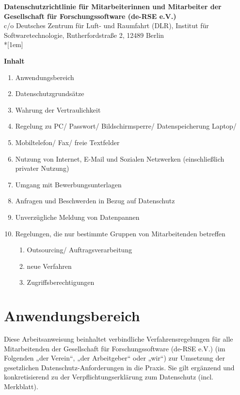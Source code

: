 \documentclass[a4paper, fontsize=11pt]{scrartcl}
\begin{document}
\thispagestyle{headings}
\vspace{-8.5cm}
\begin{centering}
{\large\textbf{Datenschutzrichtlinie für Mitarbeiterinnen und Mitarbeiter der Gesellschaft für Forschungssoftware (de-RSE e.V.)}}\\
{\tiny c/o Deutsches Zentrum für Luft- und Raumfahrt (DLR), Institut für Softwaretechnologie, Rutherfordstraße 2, 12489 Berlin}\\*[1em]
\end{centering}
\vspace{0.5cm}
{\large\textbf{Inhalt}} \\
\begin{enumerate}
    \item Anwendungsbereich
    \item Datenschutzgrundsätze
    \item Wahrung der Vertraulichkeit
    \item Regelung zu PC/ Passwort/ Bildschirmsperre/ Datenspeicherung Laptop/
    \item Mobiltelefon/ Fax/ freie Textfelder
    \item Nutzung von Internet, E-Mail und Sozialen Netzwerken (einschließlich privater Nutzung)
    \item Umgang mit Bewerbungsunterlagen
    \item Anfragen und Beschwerden in Bezug auf Datenschutz
    \item Unverzügliche Meldung von Datenpannen
    \item Regelungen, die nur bestimmte Gruppen von Mitarbeitenden betreffen
    \begin{enumerate}
        \item Outsourcing/ Auftragsverarbeitung
        \item neue Verfahren
        \item Zugriffsberechtigungen
    \end{enumerate} 
\end{enumerate}

\vspace{0.5cm}

\section{Anwendungsbereich}
Diese Arbeitsanweisung beinhaltet verbindliche Verfahrensregelungen für alle Mitarbeitenden der Gesellschaft für Forschungssoftware (de-RSE e.V.) (im Folgenden „der Verein“, „der Arbeitgeber“ oder „wir“) zur Umsetzung der gesetzlichen Datenschutz-Anforderungen in die Praxis. Sie gilt ergänzend und konkretisierend zu der Verpflichtungserklärung zum Datenschutz (incl. Merkblatt).
\end{document}
